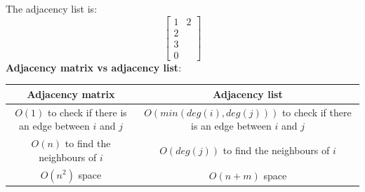 \documentclass[onecolumn]{report}
\begin{document}
The adjacency list is:\\
\begin{equation*}
    \begin{bmatrix}
    1 & 2\\
    2\\
    3\\
    0
    \end{bmatrix}
\end{equation*}
\textbf{Adjacency matrix vs adjacency list}:\\
\begin{table}[H]
\centering
\begin{tabular}{|c|c|}
\hline
Adjacency matrix & Adjacency list\\
\hline
$O(1)$ to check if there is an edge between $i$ and $j$ & $O(min(deg(i),deg(j)))$ to check if there is an edge between $i$ and $j$\\
\hline
$O(n)$ to find the neighbours of $i$ & $O(deg(j))$ to find the neighbours of $i$\\
\hline
$O(n^2)$ space & $O(n+m)$ space\\
\hline
\end{tabular}
\end{table}
\end{document}
